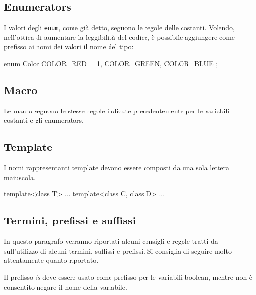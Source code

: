 \subsection{Enumerators}\label{ssec:enumname}

I valori degli \texttt{enum}, come già detto, seguono le regole delle costanti.
Volendo, nell'ottica di aumentare la leggibilità del codice, è possibile aggiungere come prefisso ai nomi dei valori il nome del tipo:

\begin{minipage}[t]{\rbwidth}
\begin{RightCode}
enum Color
{
	COLOR_RED = 1,
	COLOR_GREEN,
	COLOR_BLUE
};
\end{RightCode}
\end{minipage}

\subsection{Macro}\label{ssec:macroname}

Le macro seguono le stesse regole indicate precedentemente per le variabili costanti e gli enumerators.

\subsection{Template}\label{ssec:templatename}

I nomi rappresentanti template devono essere composti da una sola lettera maiuscola.

\begin{minipage}[t]{\rbwidth}
\begin{RightCode}
template<class T> ...
template<class C, class D> ...
\end{RightCode}
\end{minipage}

\subsection{Termini, prefissi e suffissi}\label{ssec:prefixsuffix}

In questo paragrafo verranno riportati alcuni consigli e regole tratti da \cite{codestyle:geotechnical} sull'utilizzo di alcuni termini, suffissi e prefissi.
Si consiglia di seguire molto attentamente quanto riportato.%

Il prefisso \emph{is} deve essere usato come prefisso per le variabili boolean, mentre non è consentito negare il nome della variabile.

